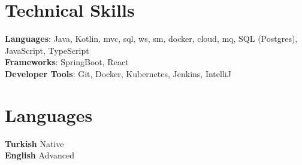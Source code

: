 \documentclass[letterpaper,11pt]{article}
\makeatletter
\newcommand{\resumeItem}[1]{
    \item\small{
            {#1 \vspace{-2pt}}
    }
}
\newcommand{\resumeProjectHeading}[2]{
    \item
    \begin{tabular*}{0.97\textwidth}{l@{\extracolsep{\fill}}r}
    \small#1 & #2 \\
    \end{tabular*}\vspace{-7pt}
}
\newcommand{\resumeSubHeadingListStart}{\begin{itemize}[leftmargin=0.15in, label={}]}
\newcommand{\resumeSubHeadingListEnd}{\end{itemize}}
\newcommand{\resumeItemListStart}{\begin{itemize}}
\newcommand{\resumeItemListEnd}{\end{itemize}\vspace{-5pt}}
\makeatother
\begin{document}



\section{Technical Skills}
\begin{itemize}[leftmargin=0.15in, label={}]
\small{\item{
\textbf{Languages}{: Java, Kotlin, mvc, sql, ws, sm, docker, cloud, mq, SQL (Postgres), JavaScript, TypeScript} \\
\textbf{Frameworks}{: SpringBoot, React } \\
\textbf{Developer Tools}{: Git, Docker, Kubernetes, Jenkins, IntelliJ}
}}
\end{itemize}

\section{Languages}
\begin{itemize}[leftmargin=0.15in, label={}]
\small{\item{
\textbf{Turkish}{ Native } \\
\textbf{English}{ Advanced }
}}
\end{itemize}


\end{document}
